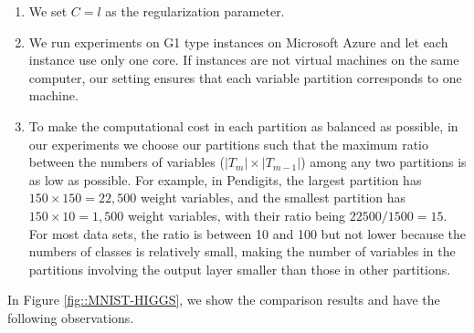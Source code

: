 \documentclass[12pt]{article}
\renewcommand{\baselinestretch}{2}
\begin{document}
\begin{enumerate}[1.]
\label{cg-stop-discuss-1}
\item
We set $C = l$ as the regularization parameter.
\item
We run experiments on G1 type instances on Microsoft Azure 
and let each instance use only one core. If instances
are not virtual machines on the same computer, our 
setting ensures that each variable partition corresponds to one machine.

\item
    To make the computational cost in each partition as balanced as possible, in our experiments we choose our partitions such that the maximum ratio between the numbers of variables ($|T_m| \times |T_{m-1}|$) among any two partitions is as low as possible. For example, in {\sf Pendigits}, the largest partition has $150 \times 150 = 22,500$ weight variables, and the smallest partition has $150 \times 10 = 1,500$ weight variables, with their ratio being $22500 / 1500 = 15$. For most data sets, the ratio is between 10 and 100 but not lower because the numbers of classes is relatively small, making the number of variables in the partitions involving the output layer smaller than those in other partitions.

\end{enumerate}


In Figure \ref{fig::MNIST-HIGGS}, we show the comparison results and have the following observations.
\end{document}
